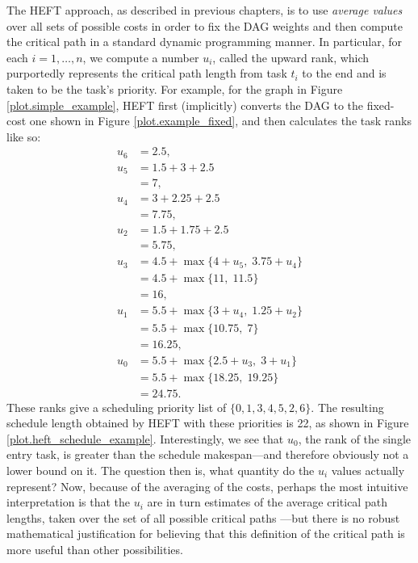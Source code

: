 \documentclass[12pt]{article}
\begin{document}
The HEFT approach, as described in previous chapters, is to use {\em average values} over all sets of possible costs in order to fix the DAG weights and then compute the critical path in a standard dynamic programming manner. In particular, for each $i = 1, \dots, n$, we compute a number $u_i$, called the upward rank, which purportedly represents the critical path length from task $t_i$ to the end and is taken to be the task's priority. For example, for the graph in Figure \ref{plot.simple_example}, HEFT first (implicitly) converts the DAG to the fixed-cost one shown in Figure \ref{plot.example_fixed}, and then calculates the task ranks like so: 
\begin{align*}
u_6 &= 2.5, \\
u_5 &= 1.5 + 3 + 2.5 \\
&= 7, \\
u_4 &= 3 + 2.25 + 2.5 \\
&= 7.75, \\
u_2 &= 1.5 + 1.75 + 2.5\\
&= 5.75, \\
u_3 &= 4.5 + \max\{ 4 + u_5, \; 3.75 + u_4 \} \\
&= 4.5 + \max\{ 11, \; 11.5 \}\\
&= 16, \\
u_1 &= 5.5 + \max\{ 3 + u_4, \; 1.25 + u_2 \} \\
&= 5.5 + \max\{ 10.75, \; 7 \}\\
&= 16.25, \\
u_0 &= 5.5 + \max\{ 2.5 + u_3, \; 3 + u_1 \} \\
&= 5.5 + \max\{ 18.25, \; 19.25 \} \\
&= 24.75.
\end{align*}
These ranks give a scheduling priority list of $\{0, 1, 3, 4, 5, 2, 6\}$. The resulting schedule length obtained by HEFT with these priorities is 22, as shown in Figure \ref{plot.heft_schedule_example}. Interestingly, we see that $u_0$, the rank of the single entry task, is greater than the schedule makespan---and therefore obviously not a lower bound on it. The question then is, what quantity do the $u_i$ values actually represent? Now, because of the averaging of the costs, perhaps the most intuitive interpretation is that the $u_i$ are in turn estimates of the average critical path lengths, taken over the set of all possible critical paths ---but there is no robust mathematical justification for believing that this definition of the critical path is more useful than other possibilities.
\end{document}
